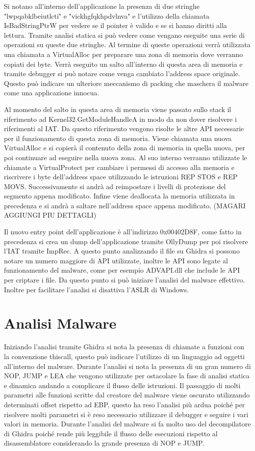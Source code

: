 \documentclass[]{article}
\begin{document}
Si notano all'interno dell'applicazione la presenza di due stringhe "lwpqabklbeiutlcti" e "vickhgfqkhpdvlnva" e l'utilizzo della chiamata IsBadStringPtrW per vedere se il pointer è valido e se si hanno diritti alla lettura. Tramite analisi statica si può vedere come vengano eseguite una serie di operazioni su queste due stringhe. Al termine di queste operazioni verrà utilizzata una chiamata a VirtualAlloc per preparare una zona di memoria dove verranno copiati dei byte.  Verrà eseguito un salto all'interno di questa area di memoria e tramite debugger si può notare come venga cambiato l'address space originale. Questo può indicare un ulteriore meccanismo di packing che maschera il malware come una applicazione innocua.

Al momento del salto in questa area di memoria viene passato sullo stack il riferimento ad Kernel32.GetModuleHandleA in modo da non dover risolvere i riferimenti al IAT. Da questo riferimento vengono risolte le altre API necessarie per il funzionamento di questa zona di memoria. Viene chiamata una nuova VirtualAlloc e si copierà il contenuto della zona di memoria in quella nuova, per poi continuare ad eseguire nella nuova zona. Al suo interno verranno utilizzate le chiamate a VirtualProtect per cambiare i permessi di accesso alla memoria e riscrivere i byte dell'address space utilizzando le istruzioni REP STOS e REP MOVS. Successivamente si andrà ad reimpostare i livelli di protezione del segmento appena modificato. Infine viene deallocata la memoria utilizzata in precedenza e si andrà a saltare nell'address space appena modificato.  (MAGARI AGGIUNGI PIU DETTAGLI)

Il nuovo entry point dell'applicazione è all'indirizzo 0x00402D8F, come fatto in precedenza si crea un dump dell'applicazione tramite OllyDump per poi risolvere l'IAT tramite ImpRec. A questo punto analizzando il file su Ghidra si possono notare un numero maggiore di API utilizzate, inoltre le API sono legate al funzionamento del malware, come per esempio ADVAPI.dll che include le API per criptare i file. Da questo punto si può iniziare l'analisi del malware effettivo. Inoltre per facilitare l'analisi si disattiva l'ASLR di Windows.

\section{Analisi Malware}
Iniziando l'analisi tramite Ghidra si nota la presenza di chiamate a funzioni con la convenzione thiscall, questo può indicare l'utilizzo di un linguaggio ad oggetti all'interno del malware. Durante l'analisi si nota la presenza di un gran numero di NOP, JUMP e LEA che vengono utilizzate per ostacolare la fase di analisi statica e dinamica andando a complicare il flusso delle istruzioni.  Il passaggio di molti parametri alle funzioni scritte dal creatore del malware viene oscurato utilizzando determinati offset rispetto ad EBP, questo ha reso l'analisi più ardua poiché per risolvere molti parametri si è reso necessario utilizzare il debugger e seguire i vari valori in memoria. Durante l'analisi del malware si fa molto uso del decompilatore di Ghidra poiché rende più leggibile il flusso delle esecuzioni rispetto al disassemblatore considerando la grande presenza di NOP e JUMP.
\end{document}
